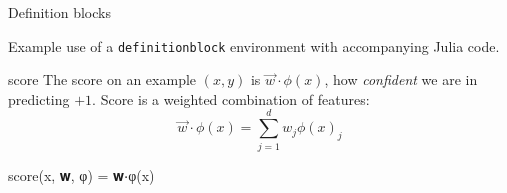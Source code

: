 \begin{frame}[fragile]{Definition blocks}

Example use of a \texttt{definitionblock} environment with accompanying Julia code.

\begin{definitionblock}{score}
    The score on an example $(x,y)$ is $\vec{w}\cdot \phi(x)$, how \textit{confident} we are in predicting $+1$. Score is a weighted combination of features:
    \[
        \vec{w} \cdot \phi(x) = \sum_{j=1}^d w_j \phi(x)_j
    \]
\end{definitionblock}

\begin{algorithmblock}
\begin{juliaverbatim}
score(x, 𝐰, φ) = 𝐰⋅φ(x)
\end{juliaverbatim}
\end{algorithmblock}

\end{frame}